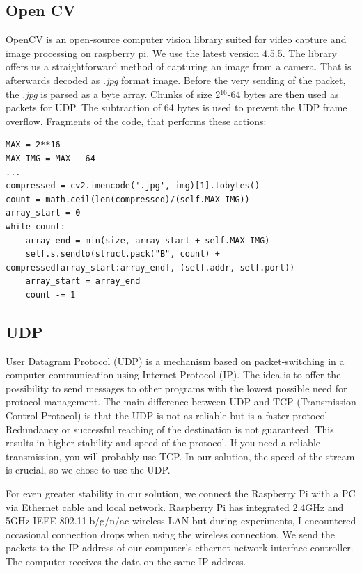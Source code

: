 \documentclass{ctuthesis}
\begin{document}
\subsection{Open CV}
OpenCV is an open-source computer vision library suited for video capture and image processing on raspberry pi\cite{3}. We use the latest version 4.5.5. The library offers us a straightforward method of capturing an image from a camera. That is afterwards decoded as \textit{.jpg} format image. Before the very sending of the packet, the \textit{.jpg} is parsed as a byte array. Chunks of size 2$^{16}$-64 bytes are then used as packets for UDP. The subtraction of 64 bytes is used to prevent the UDP frame overflow. Fragments of the code, that performs these actions:

\begin{lstlisting}
MAX = 2**16
MAX_IMG = MAX - 64
...
compressed = cv2.imencode('.jpg', img)[1].tobytes()
count = math.ceil(len(compressed)/(self.MAX_IMG))
array_start = 0
while count:
    array_end = min(size, array_start + self.MAX_IMG)
    self.s.sendto(struct.pack("B", count) + compressed[array_start:array_end], (self.addr, self.port))
    array_start = array_end
    count -= 1
\end{lstlisting}

\subsection{UDP}
User Datagram Protocol (UDP)  is a mechanism based on packet-switching in a computer communication using Internet Protocol (IP)\cite{4}. The idea is to offer the possibility to send messages to other programs with the lowest possible need for protocol management. The main difference between UDP and TCP (Transmission Control Protocol) is that the UDP is not as reliable but is a faster protocol. Redundancy or successful reaching of the destination is not guaranteed. This results in higher stability and speed of the protocol. If you need a reliable transmission, you will probably use TCP\cite{5}. In our solution, the speed of the stream is crucial, so we chose to use the UDP. 

For even greater stability in our solution, we connect the Raspberry Pi with a PC via Ethernet cable and local network. Raspberry Pi has integrated 2.4GHz and 5GHz IEEE 802.11.b/g/n/ac wireless LAN \cite{1} but during experiments, I encountered occasional connection drops when using the wireless connection. We send the packets to the IP address of our computer's ethernet network interface controller. The computer receives the data on the same IP address.
\end{document}
